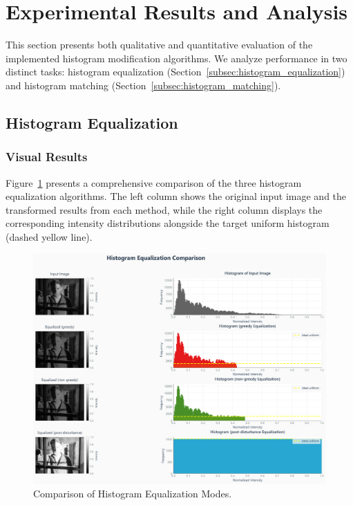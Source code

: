 \documentclass[12pt,a4paper]{article}
\begin{document}
\section{Experimental Results and Analysis}

This section presents both qualitative and quantitative evaluation of the implemented histogram modification algorithms. We analyze performance in two distinct tasks: histogram equalization (Section~\ref{subsec:histogram_equalization}) and histogram matching (Section~\ref{subsec:histogram_matching}).
\subsection{Histogram Equalization}

\subsubsection{Visual Results}

Figure~\ref{fig:eq_comp} presents a comprehensive comparison of the three histogram equalization algorithms. The left column shows the original input image and the transformed results from each method, while the right column displays the corresponding intensity distributions alongside the target uniform histogram (dashed yellow line).

\begin{figure}[H]
    \centering
    \includegraphics[width=\textwidth]{results/images/histogram_equalization_comparison.png}
    \caption{Comparison of Histogram Equalization Modes.}
    \label{fig:eq_comp}
\end{figure}
\end{document}
